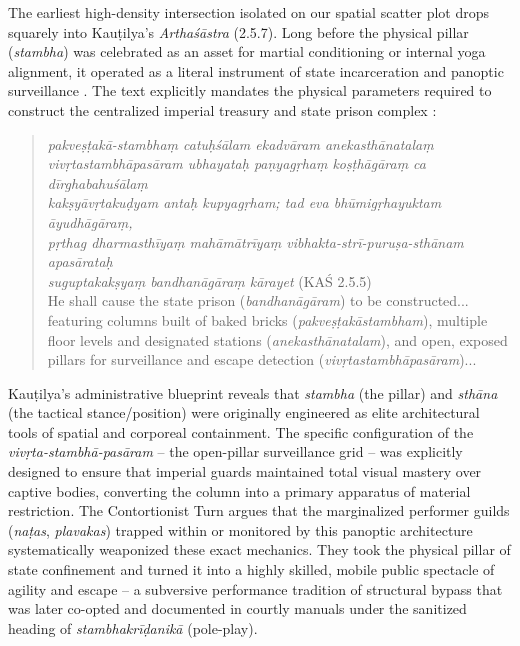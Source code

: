 \documentclass[11pt,twoside,letterpaper]{article}
\begin{document}
The earliest high-density intersection isolated on our spatial scatter plot drops squarely into Kauṭilya’s \textit{Arthaśāstra} (2.5.7). Long before the physical pillar (\textit{stambha}) was celebrated as an asset for martial conditioning or internal yoga alignment, it operated as a literal instrument of state incarceration and panoptic surveillance \citep{Kangle1969}. The text explicitly mandates the physical parameters required to construct the centralized imperial treasury and state prison complex \citep{Kangle1969}:

\begin{quote}
\textit{pakveṣṭakā-stambhaṃ catuḥśālam ekadvāram anekasthānatalaṃ \\
vivṛtastambhāpasāram ubhayataḥ paṇyagṛhaṃ koṣṭhāgāraṃ ca dīrghabahuśālaṃ\\
kakṣyāvṛtakuḍyam antaḥ kupyagṛham; tad eva bhūmigṛhayuktam āyudhāgāraṃ,\\
pṛthag dharmasthīyaṃ mahāmātrīyaṃ vibhakta-strī-puruṣa-sthānam apasārataḥ\\
suguptakakṣyaṃ bandhanāgāraṃ kārayet} (KAŚ 2.5.5) \\
He shall cause the state prison (\textit{bandhanāgāram}) to be constructed...
featuring columns built of baked bricks (\textit{pakveṣṭakāstambham}),
multiple floor levels and designated stations (\textit{anekasthānatalam}), 
and open, exposed pillars for surveillance and escape detection (\textit{vivṛtastambhāpasāram})...
\end{quote}

Kauṭilya’s administrative blueprint reveals that \textit{stambha} (the pillar) and \textit{sthāna} (the tactical stance/position) were originally engineered as elite architectural tools of spatial and corporeal containment. The specific configuration of the \textit{vivṛta-stambhā-pasāram} – the open-pillar surveillance grid – was explicitly designed to ensure that imperial guards maintained total visual mastery over captive bodies, converting the column into a primary apparatus of material restriction. The Contortionist Turn argues that the marginalized performer guilds (\textit{naṭas}, \textit{plavakas}) trapped within or monitored by this panoptic architecture systematically weaponized these exact mechanics. They took the physical pillar of state confinement and turned it into a highly skilled, mobile public spectacle of agility and escape – a subversive performance tradition of structural bypass that was later co-opted and documented in courtly manuals under the sanitized heading of \textit{stambhakrīḍanikā} (pole-play).
\end{document}
